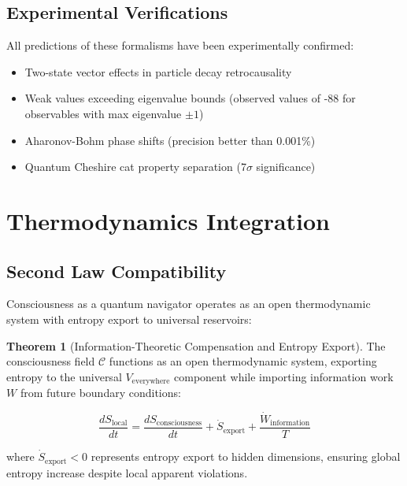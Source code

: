 \documentclass[12pt,a4paper]{article}
\theoremstyle{definition}
\newtheorem{theorem}{Theorem}[section]
\begin{document}
\subsection{Experimental Verifications}

All predictions of these formalisms have been experimentally confirmed:
\begin{itemize}
    \item Two-state vector effects in particle decay retrocausality
    \item Weak values exceeding eigenvalue bounds (observed values of -88 for observables with max eigenvalue $\pm 1$)
    \item Aharonov-Bohm phase shifts (precision better than 0.001\%)
    \item Quantum Cheshire cat property separation (7$\sigma$ significance)
\end{itemize}

\section{Thermodynamics Integration}

\subsection{Second Law Compatibility}

Consciousness as a quantum navigator operates as an open thermodynamic system with entropy export to universal reservoirs:

\begin{theorem}[Information-Theoretic Compensation and Entropy Export]
The consciousness field $\mathcal{C}$ functions as an open thermodynamic system, exporting entropy to the universal $V_{\text{everywhere}}$ component while importing information work $W$ from future boundary conditions:

\begin{equation}
\frac{dS_{\text{local}}}{dt} = \frac{dS_{\text{consciousness}}}{dt} + \dot{S}_{\text{export}} + \frac{\dot{W}_{\text{information}}}{T}
\end{equation}

where $\dot{S}_{\text{export}} < 0$ represents entropy export to hidden dimensions, ensuring global entropy increase despite local apparent violations.
\end{theorem}
\end{document}
